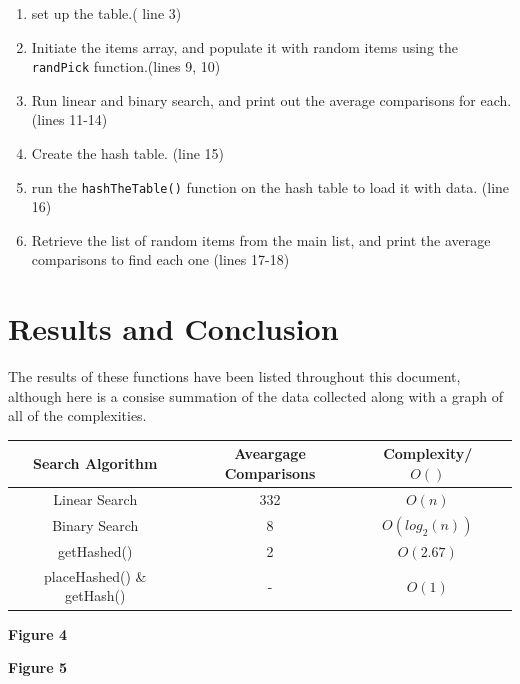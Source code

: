 \documentclass[letterpaper, 10pt]{article}
\begin{document}
\begin{enumerate}
    \item set up the table.( line 3)
    \item Initiate the items array, and populate it with random items using the \texttt{randPick} function.(lines 9, 10)
    \item Run linear and binary search, and print out the average comparisons for each. (lines 11-14)
    \item Create the hash table. (line 15)
    \item run the \texttt{hashTheTable()} function on the hash table to load it with data. (line 16)
    \item Retrieve the list of random items from the main list, and print the average comparisons to find each one (lines 17-18)
\end{enumerate}


\section{Results and Conclusion}

The results of these functions have been listed throughout this document, although here is a consise summation of the data collected along with a graph of all of the complexities.

\begin{center}
{
 \begin{tabular}{||c c c c||} 
 \hline
 Search Algorithm & Aveargage Comparisons  & Complexity/ $O()$\\ [0.5ex] 
 \hline\hline
 Linear Search& 332 &  $O(n)$\\ 
 \hline
 Binary Search& 8 & $O(log_2(n))$\\
 \hline
 getHashed() & 2 & $O(2.67)$\\
 \hline
 placeHashed() \& getHash() & - & $O(1)$ \\
 \hline
\end{tabular}
}
\textbf{Figure 4}
\end{center}
\begin{center}
\textbf{Figure 5}
\end{center}
\end{document}
